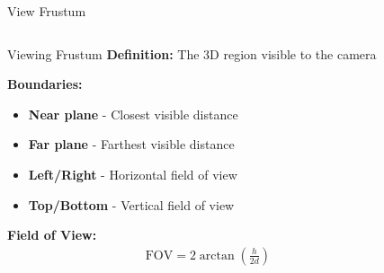 \begin{frame}{View Frustum}
    \begin{columns}
        \begin{column}{0.5\textwidth}
            \begin{mathbox}{Viewing Frustum}
                \textbf{Definition:} The 3D region visible to the camera
                
                \textbf{Boundaries:}
                \begin{itemize}
                    \item \textbf{Near plane} - Closest visible distance
                    \item \textbf{Far plane} - Farthest visible distance  
                    \item \textbf{Left/Right} - Horizontal field of view
                    \item \textbf{Top/Bottom} - Vertical field of view
                \end{itemize}
                
                \textbf{Field of View:}
                \begin{align}
                    \text{FOV} = 2 \arctan\left(\frac{h}{2d}\right)
                \end{align}
            \end{mathbox}
        \end{column}
        \begin{column}{0.5\textwidth}
\end{column}
\end{columns}
\end{frame}
